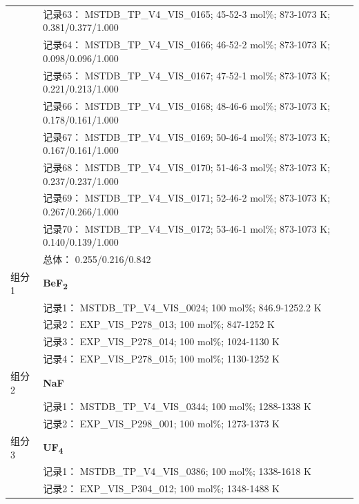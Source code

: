 \documentclass[12pt]{article}
\begin{document}
{\begin{longtable}[]{@{}
  >{\raggedright\arraybackslash}p{}
  >{\raggedright\arraybackslash}p{}@{}}
 & 记录63： MSTDB\_TP\_V4\_VIS\_0165; 45-52-3 mol\%; 873-1073 K; 0.381/0.377/1.000 \\
 & 记录64： MSTDB\_TP\_V4\_VIS\_0166; 46-52-2 mol\%; 873-1073 K; 0.098/0.096/1.000 \\
 & 记录65： MSTDB\_TP\_V4\_VIS\_0167; 47-52-1 mol\%; 873-1073 K; 0.221/0.213/1.000 \\
 & 记录66： MSTDB\_TP\_V4\_VIS\_0168; 48-46-6 mol\%; 873-1073 K; 0.178/0.161/1.000 \\
 & 记录67： MSTDB\_TP\_V4\_VIS\_0169; 50-46-4 mol\%; 873-1073 K; 0.167/0.161/1.000 \\
 & 记录68： MSTDB\_TP\_V4\_VIS\_0170; 51-46-3 mol\%; 873-1073 K; 0.237/0.237/1.000 \\
 & 记录69： MSTDB\_TP\_V4\_VIS\_0171; 52-46-2 mol\%; 873-1073 K; 0.267/0.266/1.000 \\
 & 记录70： MSTDB\_TP\_V4\_VIS\_0172; 53-46-1 mol\%; 873-1073 K; 0.140/0.139/1.000 \\
 & 总体： 0.255/0.216/0.842  \\

组分 1  & \textbf{BeF\textsubscript{2}} \\
 & 记录1： MSTDB\_TP\_V4\_VIS\_0024; 100 mol\%; 846.9-1252.2 K \\
 & 记录2： EXP\_VIS\_P278\_013; 100 mol\%; 847-1252 K \\
 & 记录3： EXP\_VIS\_P278\_014; 100 mol\%; 1024-1130 K \\
 & 记录4： EXP\_VIS\_P278\_015; 100 mol\%; 1130-1252 K  \\

组分 2  & \textbf{NaF} \\
 & 记录1： MSTDB\_TP\_V4\_VIS\_0344; 100 mol\%; 1288-1338 K \\
 & 记录2： EXP\_VIS\_P298\_001; 100 mol\%; 1273-1373 K  \\

组分 3  & \textbf{UF\textsubscript{4}} \\
 & 记录1： MSTDB\_TP\_V4\_VIS\_0386; 100 mol\%; 1338-1618 K \\
 & 记录2： EXP\_VIS\_P304\_012; 100 mol\%; 1348-1488 K  \\


\end{longtable}}
\end{document}
